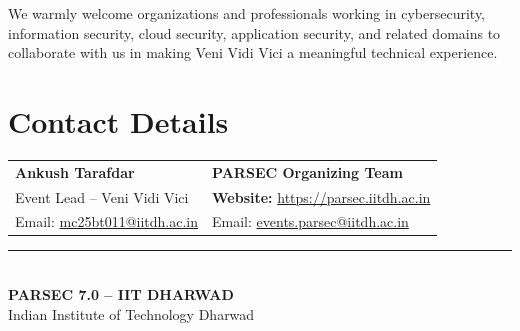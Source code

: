 \documentclass[11pt,a4paper]{article}
\begin{document}
We warmly welcome organizations and professionals working in cybersecurity,
information security, cloud security, application security, and related domains to
collaborate with us in making Veni Vidi Vici a meaningful technical experience.

\section*{Contact Details}

\begin{tabularx}{\textwidth}{@{}X X@{}}
\textbf{Ankush Tarafdar} & \textbf{PARSEC Organizing Team}\\
Event Lead -- Veni Vidi Vici & \textbf{Website:} \url{https://parsec.iitdh.ac.in}\\
Email: \href{mailto:mc25bt011@iitdh.ac.in}{mc25bt011@iitdh.ac.in} & Email: \href{mailto:events.parsec@iitdh.ac.in}{events.parsec@iitdh.ac.in}\\
\end{tabularx}

\vfill
\begin{center}
    {\color{VVVCyan}\rule{0.75\textwidth}{1pt}}\\[5pt]
    {\large\bfseries\color{VVVNavy} PARSEC 7.0 -- IIT DHARWAD}\\
    {\small Indian Institute of Technology Dharwad}
\end{center}
\end{document}
